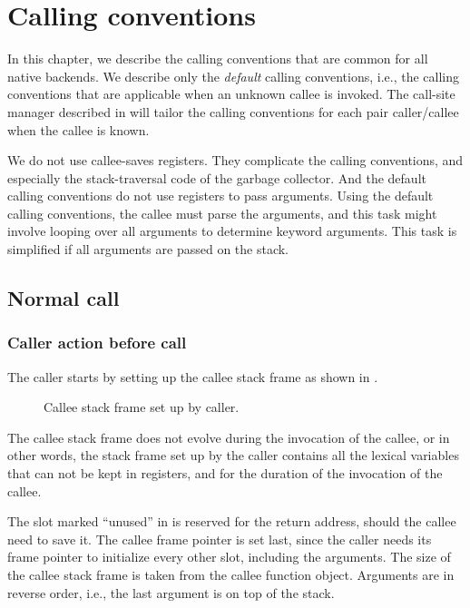 \chapter{Calling conventions}

In this chapter, we describe the \sysname{} calling conventions that
are common for all native backends.  We describe only the
\emph{default} calling conventions, i.e., the calling conventions that
are applicable when an unknown callee is invoked.  The call-site
manager described in  will tailor the
calling conventions for each pair caller/callee when the callee is
known. 

We do not use callee-saves registers.  They complicate the calling
conventions, and especially the stack-traversal code of the garbage
collector.  And the default calling conventions do not use registers
to pass arguments.  Using the default calling conventions, the callee
must parse the arguments, and this task might involve looping over all
arguments to determine keyword arguments.  This task is simplified if
all arguments are passed on the stack.

\section{Normal call}

\subsection{Caller action before call}

The caller starts by setting up the callee stack frame as
shown in .

\begin{figure}
\begin{center}
\end{center}
\caption{\label{fig-initial-callee-stack-frame}
Callee stack frame set up by caller.}
\end{figure}

The callee stack frame does not evolve during the invocation of the
callee, or in other words, the stack frame set up by the caller
contains all the lexical variables that can not be kept in registers,
and for the duration of the invocation of the callee.

The slot marked ``unused'' in 
is reserved for the return address, should the callee need to save it.
The callee frame pointer is set last, since the caller needs its frame
pointer to initialize every other slot, including the arguments.  The
size of the callee stack frame is taken from the callee function
object.  Arguments are in reverse order, i.e., the last argument is on
top of the stack.

